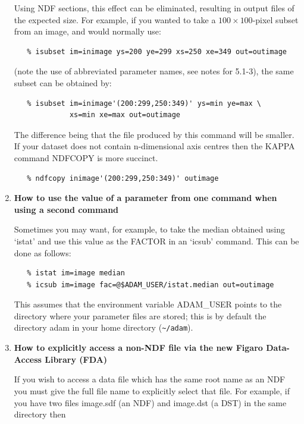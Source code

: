 \documentclass[11pt,twoside]{article}
\newcommand{\latorhtm}[2]{#1}
\newcommand{\latorhtm}[2]{#2}
\begin{document}
\begin{enumerate}
      Using NDF sections, this effect can be eliminated, resulting in
      output files of the expected size.  For example, if you wanted to
      take a \latorhtm{$100\times 100$}{100x100}-pixel subset from an image,
      and would normally use:

\begin{verbatim}
   % isubset im=inimage ys=200 ye=299 xs=250 xe=349 out=outimage
\end{verbatim}

      (note the use of abbreviated parameter names, see notes for 5.1-3),
      the same subset can be obtained by:

\begin{verbatim}
   % isubset im=inimage'(200:299,250:349)' ys=min ye=max \
             xs=min xe=max out=outimage
\end{verbatim}

      The difference being that the file produced by this command will
      be smaller.  If your dataset does not contain n-dimensional
      axis centres then the KAPPA command NDFCOPY is more succinct.

\begin{verbatim}
   % ndfcopy inimage'(200:299,250:349)' outimage
\end{verbatim}

\item {\bf How to use the value of a parameter from one command when using
      a second command}

      Sometimes you may want, for example, to take the median obtained
      using `istat' and use this value as the FACTOR in an `icsub' command.
      This can be done as follows:

\begin{verbatim}
   % istat im=image median
   % icsub im=image fac=@$ADAM_USER/istat.median out=outimage
\end{verbatim}

      This assumes that the environment variable ADAM\_USER points to the
      directory where your parameter files are stored; this is by default
      the directory adam in your home directory (\verb+~/adam+).

\item {\bf How to explicitly access a non-NDF file via the new Figaro
      Data-Access Library (FDA)}

      If you wish to access a data file which has the same root name as
      an NDF you must give the full file name to explicitly select that
      file.  For example, if you have two files image.sdf (an NDF) and
      image.dst (a DST) in the same directory then


\end{enumerate}
\end{document}
